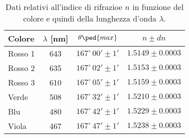 \begin{table}[H]
    \centering
    \small
    \begin{tabular}{l c c c}
        \toprule
        Colore & $\lambda$ [nm] & $\theta\ped{max}$ & $n \pm dn$ \\
        \midrule
		Rosso 1	& 	643 &	$167^\circ \, 00' \pm 1'$ &	$1.5149 \pm 0.0003$ \\	
		Rosso 2	& 	635 &	$167^\circ \, 02' \pm 1'$ &	$1.5153 \pm 0.0003$ \\
		Rosso 3	& 	610 &	$167^\circ \, 05' \pm 1'$ &	$1.5159 \pm 0.0003$ \\
		Verde &		508 &	$167^\circ \, 32' \pm 1'$ &	$1.5210 \pm 0.0003$ \\
		Blu &		480 &	$167^\circ \, 42' \pm 1'$ &	$1.5229 \pm 0.0003$ \\
		Viola &		467 &	$167^\circ \, 47' \pm 1'$ &	$1.5238 \pm 0.0003$ \\
        \bottomrule
    \end{tabular}
    \caption{Dati relativi all'indice di rifrazioe $n$ in funzione del colore e quindi della lunghezza d'onda $\lambda$.}
    \label{tab:enne}
\end{table}

